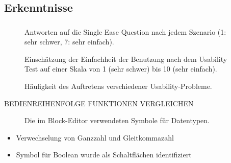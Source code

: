 \subsection{Erkenntnisse}
\begin{frame}
  \frametitle{\currentsectionname}

  \begin{figure}
    
    \caption{Antworten auf die Single Ease Question nach jedem Szenario (1: sehr schwer, 7: sehr einfach).}
  \end{figure}


\end{frame}

\begin{frame}

  \begin{figure}
    
    \caption{Einschätzung der Einfachheit der Benutzung nach dem Usability Test auf einer Skala von 1 (sehr schwer) bis 10 (sehr einfach).}
  \end{figure}

\end{frame}

\begin{frame}

  \begin{figure}
    
    \caption{Häufigkeit des Auftretens verschiedener Usability-Probleme.}
  \end{figure}

\end{frame}

\begin{frame}

  BEDIENREIHENFOLGE FUNKTIONEN VERGLEICHEN

\end{frame}

\begin{frame}

  \begin{figure}
    
    \caption{Die im Block-Editor verwendeten Symbole für Datentypen.}
  \end{figure}

  \begin{itemize}
    \item Verwechselung von Ganzzahl und Gleitkommazahl
    \item Symbol für Boolean wurde als Schaltflächen identifiziert
  \end{itemize}


\end{frame}

